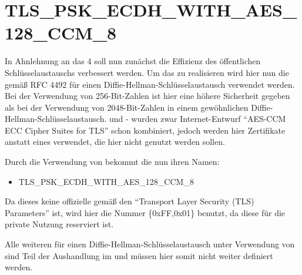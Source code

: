 \section{TLS\_PSK\_ECDH\_WITH\_AES\_128\_CCM\_8}

In Ahnlehnung an das  4 soll nun zunächst die Effizienz des öffentlichen Schlüsselaustauschs verbessert werden. Um das zu realisieren
wird hier nun die  gemäß RFC 4492 \cite{rfc4492} für einen Diffie-Hellman-Schlüsselaustausch verwendet werden. Bei der Verwendung von
256-Bit-Zahlen ist hier eine höhere Sicherheit gegeben als bei der Verwendung von 2048-Bit-Zahlen in einem gewöhnlichen Diffie-Hellman-Schlüsselaustausch.
 und - wurden zwar Internet-Entwurf "`AES-CCM ECC Cipher Suites for TLS"' \cite{draftaesecc} schon kombiniert, jedoch
werden hier Zertifikate anstatt eines  verwendet, die hier nicht genutzt werden sollen.

Durch die Verwendung von  bekommt die  nun ihren Namen:
\begin{itemize}
  \item TLS\_PSK\_ECDH\_WITH\_AES\_128\_CCM\_8
\end{itemize}
Da dieses keine offizielle  gemäß den "`Transport Layer Security (TLS) Parameters"' \cite{tlsparams} ist, wird hier die Nummer
\{0xFF,0x01\} benutzt, da diese für die private Nutzung reserviert ist.

Alle weiteren für einen Diffie-Hellman-Schlüsselaustausch unter Verwendung von  sind Teil der Aushandlung im  und müssen
hier somit nicht weiter definiert werden.

